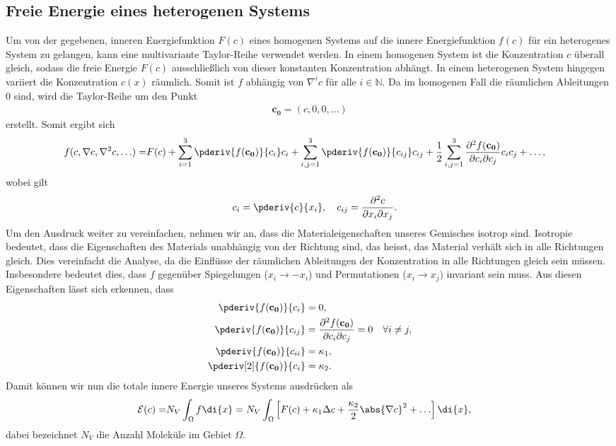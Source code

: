 \subsection{Freie Energie eines heterogenen Systems}
Um von der gegebenen, inneren Energiefunktion $F(c)$ eines homogenen Systems
auf die innere Energiefunktion $f(c)$ für ein heterogenes System zu gelangen,
kann eine multivariante Taylor-Reihe verwendet werden.
In einem homogenen System ist die Konzentration $c$ überall gleich,
sodass die freie Energie $F(c)$ ausschließlich von dieser konstanten Konzentration abhängt.
In einem heterogenen System hingegen variiert die Konzentration $c(x)$ räumlich.
Somit ist $f$ abhängig von $\nabla^i c$ für alle $i \in \mathbb{N}$.
Da im homogenen Fall die räumlichen Ableitungen $0$ sind,
wird die Taylor-Reihe um den Punkt
\begin{align*}
\mathbf{c_0}
=
(c, 0, 0, \ldots)
\end{align*}
erstellt.
Somit ergibt sich
\begin{align*}
f(c, \nabla c, \nabla^2 c, \ldots)
=
& F(c)
+ \sum_{i=1}^3 \pderiv{f(\mathbf{c_0})}{c_i} c_i
+ \sum_{i,j=1}^3 \pderiv{f(\mathbf{c_0})}{c_{ij}} c_{ij}
+ \frac{1}{2} \sum_{i,j=1}^3 \frac{\partial^2 f(\mathbf{c_0})}{%
\partial c_i \partial c_j} c_{i} c_{j}
+ \ldots
,
\end{align*}
wobei gilt
\begin{align*}
\quad
c_i
=
\pderiv{c}{x_i}
,\quad
c_{ij}
=
\frac{\partial^2 c}{\partial x_i \partial x_j}
.
\end{align*}
Um den Ausdruck weiter zu vereinfachen,
nehmen wir an,
dass die Materialeigenschaften unseres Gemisches isotrop sind.
Isotropie bedeutet,
dass die Eigenschaften des Materials unabhängig von der Richtung sind,
das heisst,
das Material verhält sich in alle Richtungen gleich.
Dies vereinfacht die Analyse,
da die Einflüsse der räumlichen Ableitungen der Konzentration
in alle Richtungen gleich sein müssen.
Insbesondere bedeutet dies,
dass $f$ gegenüber Spiegelungen ($x_i \rightarrow -x_i$) und
Permutationen ($x_i \rightarrow x_j)$ invariant sein muss.
Aus diesen Eigenschaften lässt sich erkennen,
dass
\begin{align*}
\pderiv{f(\mathbf{c_0})}{c_i}
&=
0,
\\
\pderiv{f(\mathbf{c_0})}{c_{ij}}
&=
\frac{\partial^2 f(\mathbf{c_0})}{\partial c_i \partial c_j}
=
0
\quad \forall i \neq j,
\\
\pderiv{f(\mathbf{c_0})}{c_{ii}}
&=
\kappa_1,
\\
 \pderiv[2]{f(\mathbf{c_0})}{c_i}
&=
\kappa_2
.
\end{align*}
Damit können wir nun die totale innere Energie unseres Systems ausdrücken als
\begin{align}
\mathcal{E}(c)
=
&N_V \int_\Omega f\di{x}
=
N_V \int_\Omega \left[
F(c) + \kappa_1 \Delta c + \frac{\kappa_2}{2} \abs{\nabla c}^2  + \ldots
\right]\di{x}
\label{cahnhilliard:energylong}
,
\end{align}
dabei bezeichnet $N_V$ die Anzahl Moleküle im Gebiet $\Omega$.

